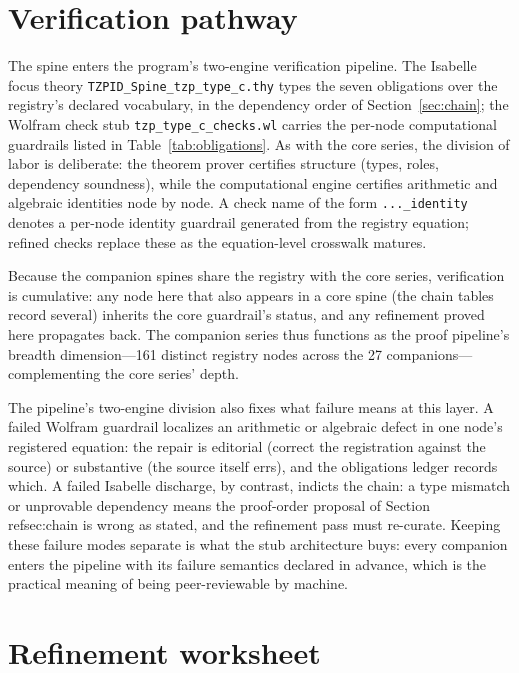 \documentclass[11pt]{article}
\theoremstyle{remark}
\begin{document}
\section{Verification pathway}
\label{sec:verify}

The spine enters the program's two-engine verification pipeline. The Isabelle focus theory \texttt{TZPID\_Spine\_tzp\_type\_c.thy} types the seven obligations over the registry's declared vocabulary, in the dependency order of Section~\ref{sec:chain}; the Wolfram check stub \texttt{tzp\_type\_c\_checks.wl} carries the per-node computational guardrails listed in Table~\ref{tab:obligations}. As with the core series, the division of labor is deliberate: the theorem prover certifies structure (types, roles, dependency soundness), while the computational engine certifies arithmetic and algebraic identities node by node. A check name of the form \texttt{...\_identity} denotes a per-node identity guardrail generated from the registry equation; refined checks replace these as the equation-level crosswalk matures.

Because the companion spines share the registry with the core series, verification is cumulative: any node here that also appears in a core spine (the chain tables record several) inherits the core guardrail's status, and any refinement proved here propagates back. The companion series thus functions as the proof pipeline's breadth dimension---161 distinct registry nodes across the 27 companions---complementing the core series' depth.

The pipeline's two-engine division also fixes what failure means at this layer. A failed Wolfram guardrail localizes an arithmetic or algebraic defect in one node's registered equation: the repair is editorial (correct the registration against the source) or substantive (the source itself errs), and the obligations ledger records which. A failed Isabelle discharge, by contrast, indicts the chain: a type mismatch or unprovable dependency means the proof-order proposal of Section~\\ref{sec:chain} is wrong as stated, and the refinement pass must re-curate. Keeping these failure modes separate is what the stub architecture buys: every companion enters the pipeline with its failure semantics declared in advance, which is the practical meaning of being peer-reviewable by machine.

\section{Refinement worksheet}
\label{sec:worksheet}
\end{document}

